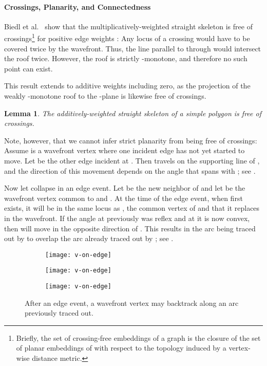 \documentclass[preprint]{elsarticle}
\newtheorem{lemma}{Lemma}
\begin{document}
\paragraph{Crossings, Planarity, and Connectedness}

Biedl et al.~\cite{Bie&15a} show that the mul\-ti\-plica\-tive\-ly-weighted
straight skeleton is free of crossings\footnote{Briefly, the set of crossing-free embeddings of a graph  is the closure of
the set of planar embeddings of  with respect to the topology induced by a
vertex-wise distance metric.
} for positive edge weights :  Any locus  of a crossing would have to be covered twice
by the wavefront.  Thus, the line parallel to  through  would intersect the roof twice.
However, the roof is strictly -monotone, and therefore no such point can exist.

This result extends to additive weights including zero, as the projection of
the weakly -monotone roof to the -plane is likewise free of crossings.

\begin{lemma}
   \label{lem:no-crossings}
   The additively-weighted straight skeleton of a simple polygon is free of
   crossings.
\end{lemma}

Note, however, that we cannot infer strict planarity from being free of
crossings:  Assume  is a wavefront vertex where one incident edge  has
not yet started to move.  Let  be the other edge incident at .
Then  travels on the supporting line of , and the direction of
this movement depends on the angle that  spans with ; see
.

Now let  collapse in an edge event.  Let  be the new neighbor
of  and let  be the wavefront vertex common to  and .
At the time of the edge event, when  first exists, it will be in the same
locus as , the common vertex of  and  that it replaces in the
wavefront.
If the angle at  previously was reflex and at  it is now convex,
then  will move in the opposite direction of  .
This results in the arc being traced out by  to overlap the arc
already traced out by ; see .

\begin{figure}[ht!]
  \centering
  \begin{subfigure}[b]{0.30\textwidth}
    \centering
    \texttt{[image: v-on-edge]}
  \end{subfigure}
  \hspace{0.1em}
  \begin{subfigure}[b]{0.30\textwidth}
    \centering
    \texttt{[image: v-on-edge]}
  \end{subfigure}
  \hspace{0.1em}
  \begin{subfigure}[b]{0.30\textwidth}
    \centering
    \texttt{[image: v-on-edge]}
  \end{subfigure}
  \caption{After an edge event, a wavefront vertex may backtrack
    along an arc previously traced out.
  }
  \label{fig:v-on-edge-backtrack}
\end{figure}
\end{document}
